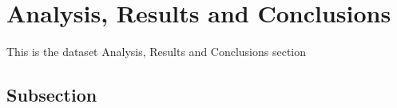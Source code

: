 \section{Analysis, Results and Conclusions}\label{Section label}
This is the dataset Analysis, Results and Conclusions section
\subsection{Subsection}\label{subsection}